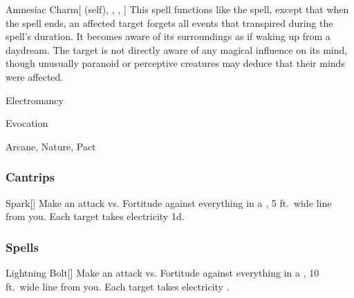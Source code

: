 \lowercase{\hypertarget{spell:Amnesiac Charm}{}}\label{spell:Amnesiac Charm}
\begin{attuneability}[\nth{5}]{\hypertarget{spell:Amnesiac Charm}{Amnesiac Charm}}[ (self), , , ]
This spell functions like the  spell, except that when the spell ends, an affected target forgets all events that transpired during the spell's duration.
It becomes aware of its surroundings as if waking up from a daydream.
The target is not directly aware of any magical influence on its mind, though unusually paranoid or perceptive creatures may deduce that their minds were affected.
\end{attuneability}
\vspace{0.25em}


\newpage
\begin{spellsection}{Electromancy}

\begin{spellheader}
\end{spellheader}


 Evocation

 Arcane, Nature, Pact

\subsubsection{Cantrips}


\begin{freeability}{Spark}[]
Make an attack vs. Fortitude against everything in a \areamed, 5 ft.\ wide line from you.
\hit Each target takes electricity  \minus1d.
\end{freeability}

\end{spellsection}


\subsubsection{Spells}


\lowercase{\hypertarget{spell:Lightning Bolt}{}}\label{spell:Lightning Bolt}
\begin{apability}[\nth{1}]{\hypertarget{spell:Lightning Bolt}{Lightning Bolt}}[]
Make an attack vs. Fortitude against everything in a \arealarge, 10 ft.\ wide line from you.
\hit Each target takes electricity .
\end{apability}
\vspace{0.25em}



